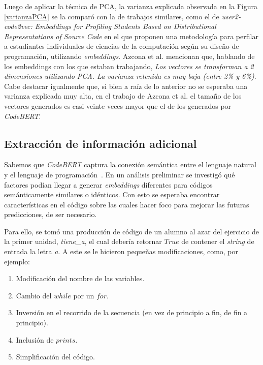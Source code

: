 \documentclass[11pt,a4paper,twoside,openany]{tesis}
\begin{document}
Luego de aplicar la técnica de PCA, la varianza explicada observada en la Figura \ref{varianzaPCA} se la comparó con la de trabajos similares, como el de \emph{user2-code2vec: Embeddings for Profiling Students Based on Distributional Representations of Source Code} \cite{user2code} en el que proponen una metodología para perfilar a estudiantes individuales de ciencias de la computación según su diseño de programación, utilizando \emph{embeddings}. Azcona et al. mencionan que, hablando de los embeddings con los que estaban trabajando, \emph{Los vectores se transforman a 2 dimensiones utilizando PCA. La varianza retenida es muy baja (entre 2\% y 6\%)}. Cabe destacar igualmente que, si bien a raíz de lo anterior no se esperaba una varianza explicada muy alta, en el trabajo de Azcona et al. el tamaño de los vectores generados es casi veinte veces mayor que el de los generados por \emph{CodeBERT}.

\subsection{Extracción de información adicional}\label{subsec:extraccion}

Sabemos que \emph{CodeBERT} captura la conexión semántica entre el lenguaje natural y el lenguaje de programación~\cite{codeBert}. En un análisis preliminar se investigó qué factores podían llegar a generar \emph{embeddings} diferentes para códigos semánticamente similares o idénticos. Con esto se esperaba encontrar características en el código sobre las cuales hacer foco para mejorar las futuras predicciones, de ser necesario. 

Para ello, se tomó una producción de código de un alumno al azar del ejercicio de la primer unidad, \emph{tiene\_a}, el cual debería retornar $True$ de contener el \emph{string} de entrada la letra \emph{a}. A este se le hicieron pequeñas modificaciones, como, por ejemplo:
\begin{enumerate}
    \item Modificación del nombre de las variables.
    \item Cambio del $while$ por un $for$.
    \item Inversión en el recorrido de la secuencia (en vez de principio a fin, de fin a principio).
    \item Inclusión de $prints$.
    \item Simplificación del código.
\end{enumerate}
\end{document}
